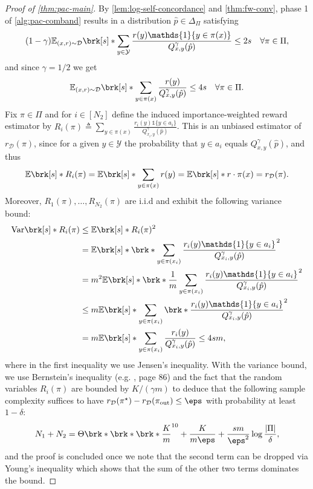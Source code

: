 \documentclass[11pt]{article}
\newcommand{\eqdef}{\triangleq}
\renewcommand{\ind}[1]{\mathds{1}\{#1\}}
\newcommand{\bbE}{\boldsymbol{\mathbb{E}}}
\renewcommand{\E}{\bbE}
\newcommand{\yprobg}[3]{Q^\gamma_{#2,#3}(#1)}
\newcommand{\pred}{a}
\newcommand{\rew}{r}
\newcommand{\lab}{y}
\newcommand{\piout}{\pi_{\mathrm{out}}}
\newcommand{\calY}{\mathcal{Y}}
\newcommand{\calD}{\mathcal{D}}
\theoremstyle{plain}
\begin{document}
\begin{proof}[Proof of \cref{thm:pac-main}]
    By \cref{lem:log-self-concordance} and \cref{thm:fw-conv}, phase 1 of \cref{alg:pac-comband} results in a distribution $\hat p \in \Delta_\Pi$ satisfying
    \begin{align*}
        (1-\gamma) \E_{(x,\rew) \sim \calD} \brk[s]*{\sum_{\lab \in \calY} \frac{\rew(\lab) \ind{\lab \in \pi(x)}}{\yprobg{\hat p}{x}{\lab}}} \leq 2s \quad \forall \pi \in \Pi,
    \end{align*}
    and since $\gamma = 1/2$ we get
    \begin{align*}
        \E_{(x,\rew) \sim \calD} \brk[s]*{\sum_{\lab \in \pi(x)} \frac{\rew(\lab) }{\yprobg{\hat p}{x}{\lab}}} \leq 4s \quad \forall \pi \in \Pi.
    \end{align*}
    Fix $\pi \in \Pi$ and for $i \in [N_2]$ define the induced importance-weighted reward estimator by $R_i(\pi) \eqdef \sum_{\lab \in \pi(x)} \frac{\rew_i(\lab) \ind{\lab \in \pred_i}}{\yprobg{\hat p}{x_i}{\lab}}$. This is an unbiased estimator of $\rew_\calD(\pi)$, since for a given $\lab \in \calY$ the probability that $y \in \pred_i$ equals $\yprobg{\hat p}{x}{\lab}$, and thus
    \begin{align*}
        \E \brk[s]*{R_i(\pi)} = \E \brk[s]*{\sum_{\lab \in \pi(x)} \rew(y)} = \E \brk[s]*{\rew \cdot \pi(x)} = \rew_\calD(\pi).
    \end{align*}
    Moreover, $R_1(\pi),\ldots,R_{N_2}(\pi)$ are i.i.d and exhibit the following variance bound:
    \begin{align*}
        \mathrm{Var} \brk[s]*{R_i(\pi)}
        &\leq
        \E \brk[s]*{R_i(\pi)^2} \\
        &=
        \E \brk[s]*{\brk*{\sum_{\lab \in \pi(x_i)} \frac{\rew_i(\lab) \ind{y \in \pred_i}}{\yprobg{\hat p}{x_i}{\lab}}}^2} \\
        &=
        m^2 \E \brk[s]*{\brk*{\frac{1}{m}\sum_{\lab \in \pi(x_i)} \frac{\rew_i(\lab) \ind{\lab \in \pred_i}}{\yprobg{\hat p}{x_i}{\lab}}}^2} \\
        &\leq
        m \E \brk[s]*{\sum_{\lab \in \pi(x_i)} \brk*{\frac{\rew_i(\lab) \ind{\lab \in \pred_i}}{\yprobg{\hat p}{x_i}{\lab}}}^2} \\
        &=
        m \E \brk[s]*{\sum_{\lab \in \pi(x_i)} \frac{\rew_i(\lab)}{\yprobg{\hat p}{x_i}{\lab}}} \leq 4sm,
    \end{align*}
    where in the first inequality we use Jensen's inequality. With the variance bound, we use Bernstein's inequality (e.g. \cite{lattimore2020bandit}, page 86) and the fact that the random variables $R_i(\pi)$ are bounded by $K / (\gamma m)$ to deduce that the following sample complexity suffices to have $\rew_\calD(\pi^\star) - \rew_\calD(\piout) \leq \eps$ with probability at least $1-\delta$:
    \begin{align*}
        N_1 + N_2 = \Theta \brk*{\brk*{\brk*{\frac{K}{m}}^{10} +  \frac{K}{m \eps} + \frac{sm}{\eps^2}} \log \frac{|\Pi|}{\delta}}, 
    \end{align*}
    and the proof is concluded once we note that the second term can be dropped via Young's inequality which shows that the sum of the other two terms dominates the bound.
\end{proof}
\end{document}
